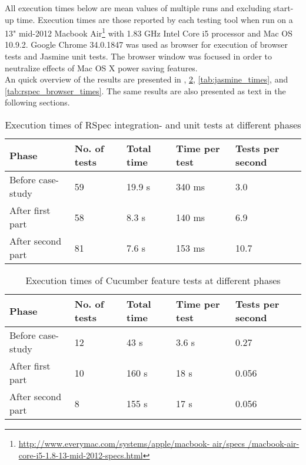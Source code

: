 \label{sec:results_time}

All execution times below are mean values of multiple runs and excluding
start-up time. Execution times are those reported by each testing tool
when run on a 13" mid-2012 Macbook
Air\footnote{\url{http://www.everymac.com/systems/apple/macbook-
air/specs /macbook-air-core-i5-1.8-13-mid-2012-specs.html}} with 1.83
GHz Intel Core i5 processor and Mac OS 10.9.2. Google Chrome 34.0.1847
was used as browser for execution of browser tests and Jasmine unit
tests. The browser window was focused in order to neutralize effects of
Mac OS X power saving features.\\

An quick overview of the results are presented in ,
\ref{tab:cucumber_times}, \ref{tab:jasmine_times}, and
\ref{tab:rspec_browser_times}. The same results are also presented as
text in the following sections.\\

\begin{table}[t]
    \centering
    \begin{tabular}{l l l l l}
        Phase & No. of tests & Total time & Time per test & Tests per second\\
        \hline
        Before case-study & 59 & 19.9 s & 340 ms & 3.0 \\
        After first part  & 58 & 8.3 s  & 140 ms & 6.9 \\
        After second part & 81 & 7.6 s  & 153 ms & 10.7\\
    \end{tabular}
    \caption{ Execution times of RSpec integration- and unit tests at different phases }
    \label{tab:unit_times}
\end{table}

\begin{table}[t]
    \centering
    \begin{tabular}{l l l l l}
        Phase & No. of tests & Total time & Time per test & Tests per second \\
        \hline
        Before case-study & 12 & 43 s & 3.6 s & 0.27 \\
        After first part  & 10 & 160 s & 18 s & 0.056\\
        After second part & 8 &  155 s & 17 s & 0.056\\
    \end{tabular}
    \caption{ Execution times of Cucumber feature tests at different phases }
    \label{tab:cucumber_times}
\end{table}

